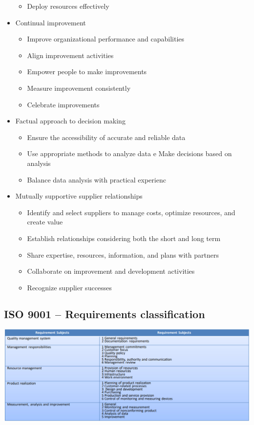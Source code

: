 \documentclass{article}
\begin{document}
\begin{itemize}
\begin{itemize}
    \item Deploy resources effectively
  \end{itemize}
  \item Continual improvement
  \begin{itemize}
    \item Improve organizational performance and capabilities
    \item Align improvement activities
    \item Empower people to make improvements
    \item Measure improvement consistently
    \item Celebrate improvements
  \end{itemize}  
  \item Factual approach to decision making
  \begin{itemize}
    \item Ensure the accessibility of accurate and reliable data
    \item Use appropriate methods to analyze data
    e Make decisions based on analysis
    \item Balance data analysis with practical experienc
  \end{itemize}  
  \item Mutually supportive supplier relationships
  \begin{itemize}
    \item Identify and select suppliers to manage costs, optimize resources, and create value
    \item Establish relationships considering both the short and long term
    \item Share expertise, resources, information, and plans with partners
    \item Collaborate on improvement and development activities
    \item Recognize supplier successes
  \end{itemize}
\end{itemize}

\subsection{ISO 9001 – Requirements classification}
\begin{center}
  \includegraphics[scale=0.5]{requirements_classification.png}
\end{center}
\end{document}
